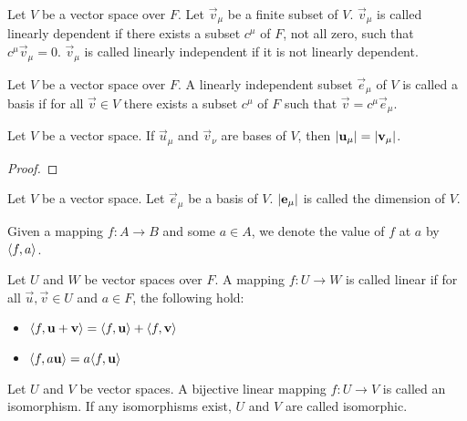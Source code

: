 \documentclass[../main.tex]{subfiles}
\begin{document}
    \begin{definition}
        Let \(V\) be a vector space over \(F\). Let \(\vec{v}_{\mu}\) be a finite subset of \(V\). \(\vec{v}_{\mu}\) is called linearly dependent if there exists a subset \(c^{\mu}\) of \(F\), not all zero, such that \(c^{\mu}\vec{v}_{\mu}=0\). \(\vec{v}_{\mu}\) is called linearly independent if it is not linearly dependent.
    \end{definition}
    \begin{definition}[Bases]
        Let \(V\) be a vector space over \(F\). A linearly independent subset \(\vec{e}_{\mu}\) of \(V\) is called a basis if for all \(\vec{v}\in{}V\) there exists a subset \(c^{\mu}\) of \(F\) such that \(\vec{v}=c^{\mu}\vec{e}_{\mu}\).
    \end{definition}
    \begin{theorem}
        Let \(V\) be a vector space. If \(\vec{u}_{\mu}\) and \(\vec{v}_{\nu}\) are bases of \(V\), then \(\lvert\mathbf{u}_{\mu}\rvert=\lvert\mathbf{v}_{\mu}\rvert\).
        \begin{proof}
        \end{proof}
    \end{theorem}
    \begin{definition}[Dimension]
        Let \(V\) be a vector space. Let \(\vec{e}_{\mu}\) be a basis of \(V\). \(\lvert\mathbf{e}_{\mu}\rvert\) is called the dimension of \(V\).
    \end{definition}
    \begin{notation}[Mappings]
        Given a mapping \(f:A\to{}B\) and some \(a\in{}A\), we denote the value of \(f\) at \(a\) by \(\langle f,a\rangle\).
    \end{notation}
    \begin{definition}
        Let \(U\) and \(W\) be vector spaces over \(F\). A mapping \(f:U\to{}W\) is called linear if for all \(\vec{u},\vec{v}\in{}U\) and \(a\in{}F\), the following hold:
        \begin{itemize}
            \item\(\langle f,\mathbf{u}+\mathbf{v}\rangle=\langle f,\mathbf{u}\rangle+\langle f,\mathbf{v}\rangle\)
            \item\(\langle f,a\mathbf{u}\rangle=a\langle f,\mathbf{u}\rangle\)
        \end{itemize}
    \end{definition}
    \begin{definition}[Isomorphism]
        Let \(U\) and \(V\) be vector spaces. A bijective linear mapping \(f:U\to{}V\) is called an isomorphism. If any isomorphisms exist, \(U\) and \(V\) are called isomorphic.
    \end{definition}
\end{document}
